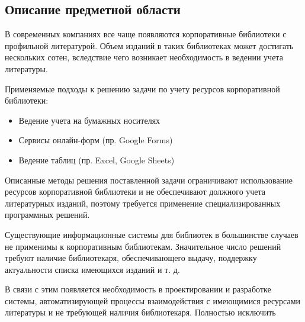 \documentclass[./intro.tex]{subfiles}
\begin{document}
\subsection{Описание предметной области}
\par 
В современных компаниях все чаще появляются корпоративные библиотеки с профильной литературой.
Объем изданий в таких библиотеках может достигать нескольких сотен, вследствие чего возникает необходимость в ведении учета литературы.
\par
Применяемые подходы к решению задачи по учету ресурсов корпоративной библиотеки:
\begin{itemize}
    \item Ведение учета на бумажных носителях
    \item Сервисы онлайн-форм (пр. Google Forms)
    \item Ведение таблиц (пр. Excel, Google Sheets)
\end{itemize}
\par Описанные методы решения поставленной задачи ограничивают использование ресурсов корпоративной библиотеки и не обеспечивают должного учета литературных изданий, поэтому требуется применение специализированных программных решений.
\par 
Существующие информационные системы для библиотек в большинстве случаев не применимы к корпоративным библиотекам.
Значительное число решений требуют наличие библиотекаря, обеспечивающего выдачу, поддержку актуальности списка имеющихся изданий и т. д.
\par
В связи с этим появляется необходимость в проектировании и разработке системы, автоматизирующей процессы взаимодействия с имеющимися ресурсами литературы и не требующей наличия библиотекаря. Полностью исключить
\par
\end{document}
